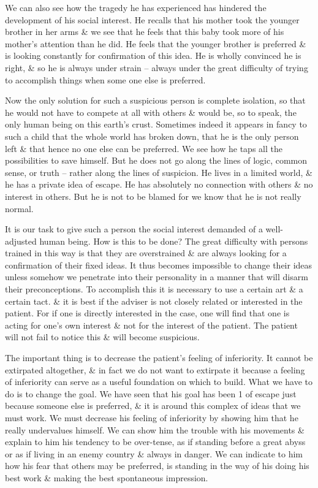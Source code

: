 \documentclass{article}
\begin{document}
We can also see how the tragedy he has experienced has hindered the development of his social interest. He recalls that his mother took the younger brother in her arms \& we see that he feels that this baby took more of his mother's attention than he did. He feels that the younger brother is preferred \& is looking constantly for confirmation of this idea. He is wholly convinced he is right, \& so he is always under strain -- always under the great difficulty of trying to accomplish things when some one else is preferred.

Now the only solution for such a suspicious person is complete isolation, so that he would not have to compete at all with others \& would be, so to speak, the only human being on this earth's crust. Sometimes indeed it appears in fancy to such a child that the whole world has broken down, that he is the only person left \& that hence no one else can be preferred. We see how he taps all the possibilities to save himself. But he does not go along the lines of logic, common sense, or truth -- rather along the lines of suspicion. He lives in a limited world, \& he has a private idea of escape. He has absolutely no connection with others \& no interest in others. But he is not to be blamed for we know that he is not really normal.

It is our task to give such a person the social interest demanded of a well-adjusted human being. How is this to be done? The great difficulty with persons trained in this way is that they are overstrained \& are always looking for a confirmation of their fixed ideas. It thus becomes impossible to change their ideas unless somehow we penetrate into their personality in a manner that will disarm their preconceptions. To accomplish this it is necessary to use a certain art \& a certain tact. \& it is best if the adviser is not closely related or interested in the patient. For if one is directly interested in the case, one will find that one is acting for one's own interest \& not for the interest of the patient. The patient will not fail to notice this \& will become suspicious.

The important thing is to decrease the patient's feeling of inferiority. It cannot be extirpated altogether, \& in fact we do not want to extirpate it because a feeling of inferiority can serve as a useful foundation on which to build. What we have to do is to change the goal. We have seen that his goal has been 1 of escape just because someone else is preferred, \& it is around this complex of ideas that we must work. We must decrease his feeling of inferiority by showing him that he really undervalues himself. We can show him the trouble with his movements \& explain to him his tendency to be over-tense, as if standing before a great abyss or as if living in an enemy country \& always in danger. We can indicate to him how his fear that others may be preferred, is standing in the way of his doing his best work \& making the best spontaneous impression.
\end{document}
